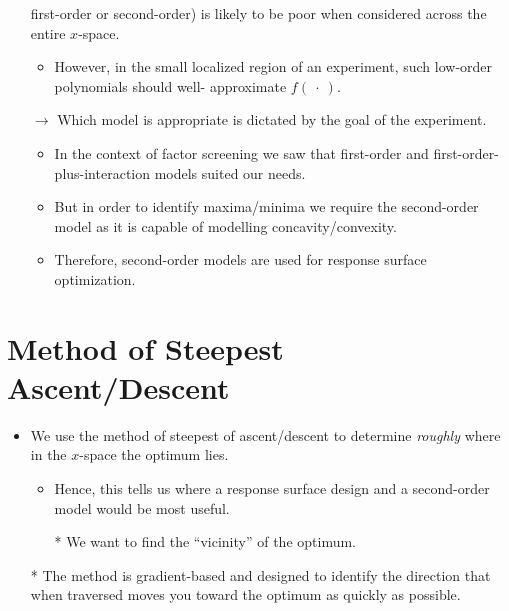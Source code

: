 \begin{itemize}
        first-order or second-order) is likely to be poor when considered across the entire $x$-space.
        \begin{itemize}[$\rightarrow$]
            \item However, in the small localized region of an experiment, such low-order polynomials should well-
                  approximate $ f(\:\cdot\:) $.
        \end{itemize}
    \item[$\rightarrow$] Which model is appropriate is dictated by the goal of the experiment.
        \begin{itemize}
            \item In the context of factor screening we saw that first-order and first-order-plus-interaction models
                  suited our needs.
            \item But in order to identify maxima/minima we require the second-order model as it is capable of
                  modelling concavity/convexity.
            \item Therefore, second-order models are used for response surface optimization.
        \end{itemize}
\end{itemize}
\section{Method of Steepest Ascent/Descent}
\begin{itemize}
    \item We use the method of steepest of ascent/descent to determine \emph{roughly} where in the $x$-space the optimum
          lies.
          \begin{itemize}
              \item Hence, this tells us where a response surface design and a second-order model would be most
                    useful.
              \item[*] We want to find the ``vicinity'' of the optimum.
          \end{itemize}
    \item[*] The method is gradient-based and designed to identify the direction that when traversed moves you
        toward the optimum as quickly as possible.
\end{itemize}
